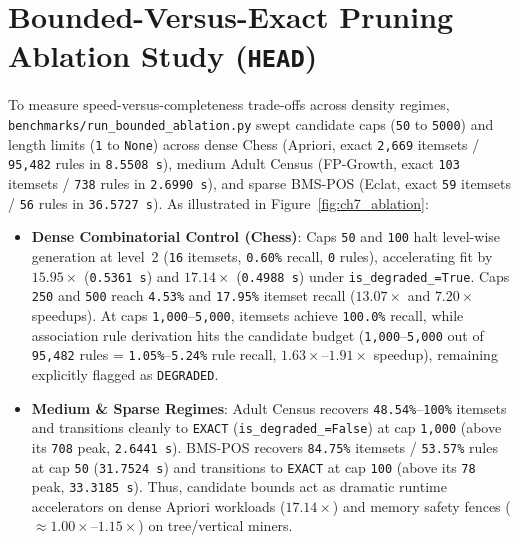 \section{Bounded-Versus-Exact Pruning Ablation Study (\texttt{HEAD})}
To measure speed-versus-completeness trade-offs across density regimes, \texttt{benchmarks/run\_\protect\allowbreak{}bounded\_\protect\allowbreak{}ablation.py} swept candidate caps (\texttt{50} to \texttt{5000}) and length limits (\texttt{1} to \texttt{None}) across dense Chess (Apriori, exact \texttt{2,669} itemsets / \texttt{95,482} rules in \texttt{8.5508 s}), medium Adult Census (FP-Growth, exact \texttt{103} itemsets / \texttt{738} rules in \texttt{2.6990 s}), and sparse BMS-POS (Eclat, exact \texttt{59} itemsets / \texttt{56} rules in \texttt{36.5727 s}). As illustrated in Figure~\ref{fig:ch7_ablation}:
\begin{itemize}
  \item \textbf{Dense Combinatorial Control (Chess)}: Caps \texttt{50} and \texttt{100} halt level-wise generation at level~2 (\texttt{16} itemsets, \texttt{0.60\%} recall, \texttt{0} rules), accelerating fit by $15.95\times$ (\texttt{0.5361 s}) and $17.14\times$ (\texttt{0.4988 s}) under \texttt{is\_\protect\allowbreak{}degraded\_\protect\allowbreak{}=True}. Caps \texttt{250} and \texttt{500} reach \texttt{4.53\%} and \texttt{17.95\%} itemset recall ($13.07\times$ and $7.20\times$ speedups). At caps \texttt{1,000}--\texttt{5,000}, itemsets achieve \texttt{100.0\%} recall, while association rule derivation hits the candidate budget (\texttt{1,000}--\texttt{5,000} out of \texttt{95,482} rules = \texttt{1.05\%}--\texttt{5.24\%} rule recall, $1.63\times$--$1.91\times$ speedup), remaining explicitly flagged as \texttt{DEGRADED}.
  \item \textbf{Medium \& Sparse Regimes}: Adult Census recovers \texttt{48.54\%}--\texttt{100\%} itemsets and transitions cleanly to \texttt{EXACT} (\texttt{is\_\protect\allowbreak{}degraded\_\protect\allowbreak{}=False}) at cap \texttt{1,000} (above its \texttt{708} peak, \texttt{2.6441 s}). BMS-POS recovers \texttt{84.75\%} itemsets / \texttt{53.57\%} rules at cap \texttt{50} (\texttt{31.7524 s}) and transitions to \texttt{EXACT} at cap \texttt{100} (above its \texttt{78} peak, \texttt{33.3185 s}). Thus, candidate bounds act as dramatic runtime accelerators on dense Apriori workloads ($17.14\times$) and memory safety fences ($\approx 1.00\times$--$1.15\times$) on tree/vertical miners.
\end{itemize}

